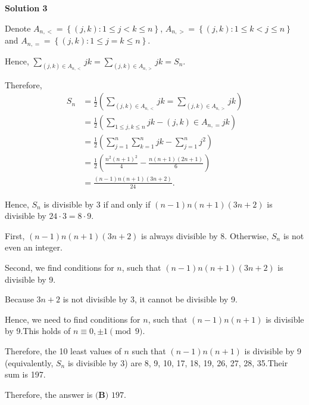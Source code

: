 \begin{enumerate}
\textbf{Solution 3}

Denote $A_{n, <} = \left\{ \left( j , k \right) : 1 \leq j < k \leq n \right\}$, $A_{n, >} = \left\{ \left( j , k \right) : 1 \leq k < j \leq n \right\}$ and $A_{n, =} = \left\{ \left( j , k \right) : 1 \leq j = k \leq n \right\}$.

 Hence, $\sum_{\left( j , k \right) \in A_{n,<}} jk = \sum_{\left( j , k \right) \in A_{n,>}} jk = S_n$.

 Therefore,
 \begin{align*} S_n & = \frac{1}{2} \left( \sum_{\left( j , k \right) \in A_{n,<}} jk = \sum_{\left( j , k \right) \in A_{n,>}} jk \right) \\ & = \frac{1}{2} \left( \sum_{1 \leq j, k \leq n} jk - {\left( j , k \right) \in A_{n,=}} jk \right) \\ & = \frac{1}{2} \left( \sum_{j=1}^n \sum_{k=1}^n jk - \sum_{j=1}^n j^2 \right) \\ & = \frac{1}{2} \left( \frac{n^2 \left( n + 1 \right)^2}{4} - \frac{n \left( n + 1 \right) \left( 2 n + 1 \right) }{6} \right) \\ & = \frac{\left( n - 1 \right) n \left( n + 1 \right) \left( 3 n + 2 \right)}{24} . \end{align*}


 Hence, $S_n$ is divisible by 3 if and only if $\left( n - 1 \right) n \left( n + 1 \right) \left( 3 n + 2 \right)$ is divisible by $24 \cdot 3 = 8 \cdot 9$.

 First, $\left( n - 1 \right) n \left( n + 1 \right) \left( 3 n + 2 \right)$ is always divisible by 8. Otherwise, $S_n$ is not even an integer.

 Second, we find conditions for $n$, such that $\left( n - 1 \right) n \left( n + 1 \right) \left( 3 n + 2 \right)$ is divisible by 9.

 Because $3 n + 2$ is not divisible by 3, it cannot be divisible by 9.

 Hence, we need to find conditions for $n$, such that $\left( n - 1 \right) n \left( n + 1 \right)$ is divisible by 9.This holds of $n \equiv 0, \pm 1 \pmod{9}$.

 Therefore, the 10 least values of $n$ such that $\left( n - 1 \right) n \left( n + 1 \right)$ is divisible by 9 (equivalently, $S_n$ is divisible by 3) are 8, 9, 10, 17, 18, 19, 26, 27, 28, 35.Their sum is 197.

 Therefore, the answer is $\boxed{\textbf{(B) }197}$.

 




\end{enumerate}
